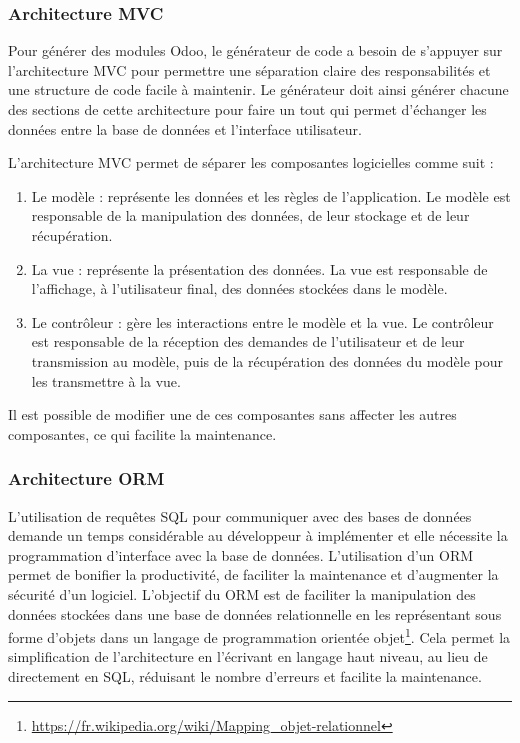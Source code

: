 
\subsubsection{Architecture MVC}

Pour générer des modules Odoo, le générateur de code a besoin de s'appuyer sur l'architecture MVC pour permettre une séparation claire des responsabilités et une structure de code facile à maintenir. Le générateur doit ainsi générer chacune des sections de cette architecture pour faire un tout qui permet d'échanger les données entre la base de données et l'interface utilisateur.

L’architecture MVC permet de séparer les composantes logicielles comme suit : 
\begin{enumerate}
    \item Le modèle : représente les données et les règles de l’application. Le modèle est responsable de la manipulation des données, de leur stockage et de leur récupération.
    \item La vue : représente la présentation des données. La vue est responsable de l’affichage, à l’utilisateur final, des données stockées dans le modèle.
    \item Le contrôleur : gère les interactions entre le modèle et la vue. Le contrôleur est responsable de la réception des demandes de l’utilisateur et de leur transmission au modèle, puis de la récupération des données du modèle pour les transmettre à la vue.
\end{enumerate}
Il est possible de modifier une de ces composantes sans affecter les autres composantes, ce qui facilite la maintenance.

\subsubsection{Architecture ORM}

L'utilisation de requêtes SQL pour communiquer avec des bases de données demande un temps considérable au développeur à implémenter et elle nécessite la programmation d'interface avec la base de données. L'utilisation d'un ORM permet de bonifier la productivité, de faciliter la maintenance et d'augmenter la sécurité d'un logiciel. L’objectif du ORM est de faciliter la manipulation des données stockées dans une base de données relationnelle en les représentant sous forme d’objets dans un langage de programmation orientée objet\footnote{\url{https://fr.wikipedia.org/wiki/Mapping_objet-relationnel}}. Cela permet la simplification de l’architecture en l’écrivant en langage haut niveau, au lieu de directement en SQL, réduisant le nombre d'erreurs et facilite la maintenance.


